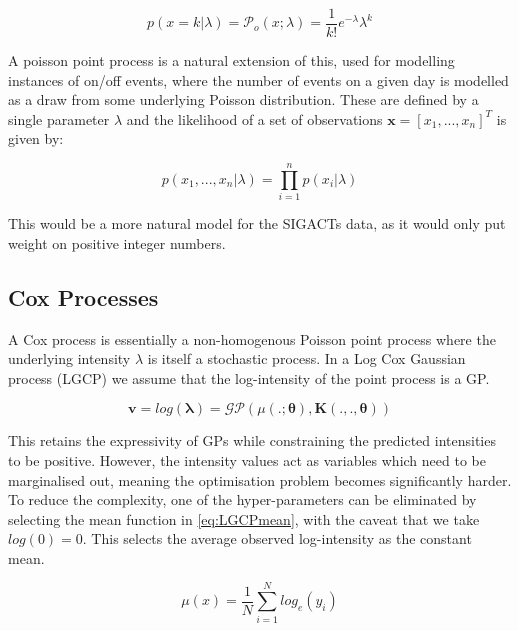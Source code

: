 \documentclass[a4paper,11pt]{report}
\begin{document}
\begin{equation}\label{eq:poisson}
 p(x=k|\lambda) = \mathcal{P}_o (x;\lambda) = \frac{1}{k!} e^{-\lambda} \lambda^k
\end{equation}

A poisson point process is a natural extension of this, used for modelling instances of on/off events, where the number of events on a given day is modelled as a draw from some underlying Poisson distribution. \cite{Gregory} These are defined by a single parameter \(\lambda\) and the likelihood of a set of observations \(\mathbf{x}=[x_1,...,x_n]^T\) is given by:

\begin{equation}
p(x_1,...,x_n|\lambda) = \prod_{i=1}^{n} p(x_i|\lambda)
\end{equation}

This would be a more natural model for the SIGACTs data, as it would only put weight on positive integer numbers. 


\subsection{Cox Processes}
A Cox process is essentially a non-homogenous Poisson point process where the underlying intensity \(\lambda\) is itself a stochastic process. In a Log Cox Gaussian process (LGCP) we assume that the log-intensity of the point process is a GP. 

\begin{equation} \label{eq:LGCPsetup}
\mathbf{v} = log(\boldsymbol{\lambda}) = \mathcal{G}\mathcal{P} ( \mu(. ;\boldsymbol{\theta}) , \mathbf{K}(. , . ,\boldsymbol{\theta}))
\end{equation}

This retains the expressivity of GPs while constraining the predicted intensities to be positive. However, the intensity values act as variables which need to be marginalised out, meaning the optimisation problem becomes significantly harder. To reduce the complexity, one of the hyper-parameters can be eliminated by selecting the mean function in \ref{eq:LGCPmean}, with the caveat that we take \(log(0)=0\). This selects the average observed log-intensity as the constant mean. 

\begin{equation} \label{eq:LGCPmean}
\mu (x) = \frac{1}{N} \sum_{i=1}^{N} log_e(y_i)
\end{equation}
\end{document}
